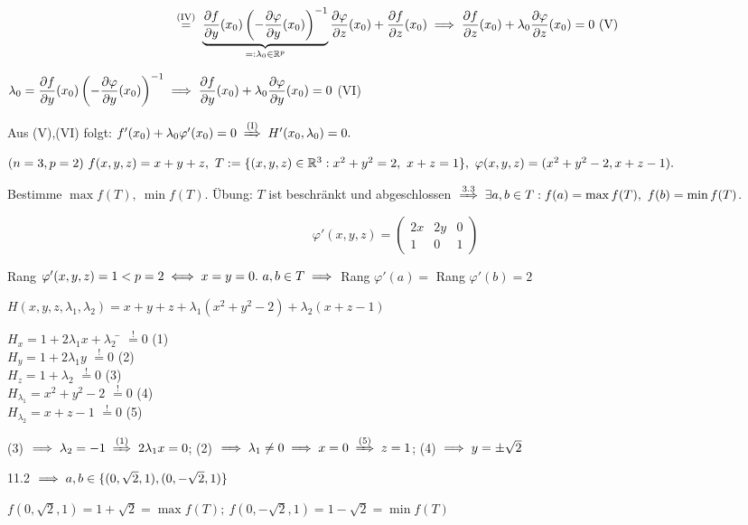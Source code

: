 \documentclass[a4paper,twoside,DIV15,BCOR12mm]{scrbook}
\begin{document}
\begin{beweis}
$$\gleichnach{(IV)} \underbrace{\frac{\partial f}{\partial y}(x_0) \left(-\frac{\partial \varphi}{\partial y}(x_0)\right)^{-1}}_{=: \lambda_0 \in \MdR^p} \frac{\partial \varphi}{\partial z}(x_0) + \frac{\partial f}{\partial z}(x_0) \folgt \frac{\partial f}{\partial z}(x_0) + \lambda_0 \frac{\partial \varphi}{\partial z}(x_0) = 0\text{ (V)}$$

$\displaystyle{\lambda_0 = \frac{\partial f}{\partial y}(x_0) \left(-\frac{\partial \varphi}{\partial y}(x_0)\right)^{-1} \ensuremath{\implies}\frac{\partial f}{\partial y}(x_0) + \lambda_0 \frac{\partial \varphi}{\partial y}(x_0) = 0}$ (VI)

Aus (V),(VI) folgt: $f'(x_0) + \lambda_0\varphi'(x_0) = 0 \folgtnach{(I)} H'(x_0,\lambda_0) = 0.$

\end{beweis}

\begin{beispiel}
$(n=3,p=2)\ f(x,y,z) = x+y+z,\ T:=\{(x,y,z) \in \mathbb{R}^3: x^2+y^2=2,\ x+z=1\},\ \varphi(x,y,z) = (x^2+y^2-2,x+z-1).$

Bestimme $\max f(T),\ \min f(T)$. Übung: $T$ ist beschränkt und abgeschlossen $\folgtnach{3.3} \exists a,b \in T: f(a) = \max f(T),\ f(b) = \min f(T)$.

$$\varphi'(x,y,z) = \left(\begin{array}{ccc}
2x & 2y & 0\\
1  & 0  & 1
\end{array}\right)$$

Rang $\varphi'(x,y,z) = 1 < p=2 \iff x=y=0.\ a,b\in T \implies$ Rang $\varphi'(a) =$ Rang $\varphi'(b) = 2$

\def\shouldbe{\overset{!}{=}}

$H(x,y,z,\lambda_1,\lambda_2) = x+y+z+\lambda_1(x^2+y^2-2) + \lambda_2(x+z-1)$\\
\begin{tabbing}
$H_x=1+2\lambda_1x+\lambda_2$ \= $\shouldbe 0$ (1)\\
$H_y=1+2\lambda_1y          $ \> $\shouldbe 0$ (2)\\
$H_z=1+\lambda_2            $ \> $\shouldbe 0$ (3)\\
$H_{\lambda_1}=x^2+y^2-2    $ \> $\shouldbe 0$ (4)\\
$H_{\lambda_2}=x+z-1        $ \> $\shouldbe 0$ (5)
\end{tabbing}

(3) $\folgt \lambda_2=-1 \folgtnach{(1)} 2\lambda_1x=0$; (2) $\folgt \lambda_1\ne0 \folgt x=0 \folgtnach{(5)} z=1$; (4) $\implies y = \pm \sqrt{2}$

11.2 $\implies a,b \in \{(0,\sqrt{2},1),(0,-\sqrt{2},1)\}$

$f(0,\sqrt{2},1) = 1+\sqrt{2} = \max f(T);\ f(0,-\sqrt{2},1) = 1-\sqrt{2} = \min f(T)$

\end{beispiel}
\end{document}
